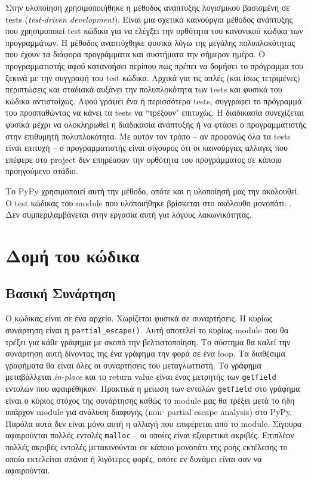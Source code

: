 Στην υλοποίηση χρησιμοποιήθηκε η μέθοδος ανάπτυξης λογισμικού βασισμένη σε
tests (\textit{test-driven development}\cite{tdd}). Είναι μια σχετικά
καινούργια μέθοδος ανάπτυξης που χρησιμοποιεί test κώδικα για να ελέγξει την
ορθότητα του κανονικού κώδικα των προγραμμάτων. Η μέθοδος αναπτύχθηκε φυσικά
λόγω της μεγάλης πολυπλοκότητας που έχουν τα διάφορα προγράμματα και συστήματα
την σήμερον ημέρα. Ο προγραμματιστής αφού κατανοήσει περίπου πως πρέπει να
δομήσει το πρόγραμμα του ξεκινά με την συγγραφή του test κώδικα. Αρχικά για
τις απλές (και ίσως τετριμένες) περιπτώσεις και σταδιακά αυξάνει την
πολυπλοκότητα των tests και φυσικά του κώδικα αντιστοίχως. Αφού γράψει ένα ή
περισσότερα tests, συγγράφει το πρόγραμμά του προσπαθώντας να κάνει τα tests
να ``τρέξουν" επιτυχώς. Η διαδικασία συνεχίζεται φυσικά μέχρι να ολοκληρωθεί η
διαδικασία ανάπτυξής ή να φτάσει ο προγραμματιστής στην επιθυμητή
πολυπλοκότητα. Με αυτόν τον τρόπο – αν προφανώς όλα τα tests είναι επιτυχή – ο
προγραμματιστής είναι σίγουρος ότι οι καινούργιες αλλαγες που επέφερε στο
project δεν επηρέασαν την ορθότητα του προγράμματος σε κάποιο προηγούμενο
στάδιο.

Το PyPy χρησιμοποιεί αυτή την μέθοδο, οπότε και η υλοποίησή μας την ακολουθεί.
Ο test κώδικας του module που υλοποιήθηκε βρίσκεται στο ακόλουθο μονοπάτι:
. Δεν
συμπεριλαμβάνεται στην εργασία αυτή για λόγους λακωνικότητας.


\section{Δομή του κώδικα}

\subsection{Βασική Συνάρτηση}

Ο κώδικας είναι σε ένα αρχείο. Χωρίζεται φυσικά σε συναρτήσεις. Η κυρίως
συνάρτηση είναι η \texttt{partial\_escape()}. Αυτή αποτελεί το κυρίως module που
θα τρέξει για κάθε γράφημα με σκοπό την βελτιστοποίηση. Το σύστημα θα καλεί την
συνάρτηση αυτή δίνοντας της ένα γράφημα την φορά σε ένα loop. Τα διαθέσιμα
γραφήματα θα είναι όλες οι συναρτήσεις του μεταγλωττιστή. Το γράφημα
μεταβάλλεται \textit{in-place} και το return value είναι ένας μετρητής των
\texttt{getfield} εντολών που αφαιρέθηκαν. Πρακτικά η μείωση των εντολών
\texttt{getfield} στο γράφημα είναι ο κύριος στόχος της συνάρτησης καθώς το
module μας θα τρέξει μετά το ήδη υπάρχον module για ανάλυση διαφυγής (non-
partial escape analysis) στο PyPy. Παρόλα αυτά δεν είναι μόνο αυτή η αλλαγή που
επιφέρεται από το module. Σίγουρα αφαιρούνται πολλές εντολές \texttt{malloc} –
οι οποίες είναι εξαιρετικά ακριβές. Επιπλέον πολλές ακριβές εντολές
μετακινούνται σε κάποιο μονοπάτι της ροής εκτέλεσης το οποίο εκτελείται σπάνια ή
λιγότερες φορές, οπότε εν δυνάμει είναι σαν να αφαιρούνται.


